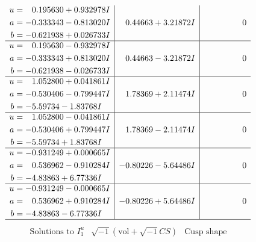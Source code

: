 \documentclass[1p]{elsarticle_modified}
\theoremstyle{definition}
\newcommand{\I}{\sqrt{-1}}
\begin{document}
$$\begin{array}{c|c|c}
\begin{aligned}
u &= \phantom{-}0.195630 + 0.932978 I \\
a &= -0.333343 - 0.813020 I \\
b &= -0.621938 + 0.026733 I\end{aligned}
 & \phantom{-}0.44663 + 3.21872 I & \phantom{-0.000000 } 0 \\ \hline\begin{aligned}
u &= \phantom{-}0.195630 - 0.932978 I \\
a &= -0.333343 + 0.813020 I \\
b &= -0.621938 - 0.026733 I\end{aligned}
 & \phantom{-}0.44663 - 3.21872 I & \phantom{-0.000000 } 0 \\ \hline\begin{aligned}
u &= \phantom{-}1.052800 + 0.041861 I \\
a &= -0.530406 - 0.799447 I \\
b &= -5.59734 - 1.83768 I\end{aligned}
 & \phantom{-}1.78369 + 2.11474 I & \phantom{-0.000000 } 0 \\ \hline\begin{aligned}
u &= \phantom{-}1.052800 - 0.041861 I \\
a &= -0.530406 + 0.799447 I \\
b &= -5.59734 + 1.83768 I\end{aligned}
 & \phantom{-}1.78369 - 2.11474 I & \phantom{-0.000000 } 0 \\ \hline\begin{aligned}
u &= -0.931249 + 0.000665 I \\
a &= \phantom{-}0.536962 - 0.910284 I \\
b &= -4.83863 + 6.77336 I\end{aligned}
 & -0.80226 - 5.64486 I & \phantom{-0.000000 } 0 \\ \hline\begin{aligned}
u &= -0.931249 - 0.000665 I \\
a &= \phantom{-}0.536962 + 0.910284 I \\
b &= -4.83863 - 6.77336 I\end{aligned}
 & -0.80226 + 5.64486 I & \phantom{-0.000000 } 0\\
 \hline 
 \end{array}$$\newpage$$\begin{array}{c|c|c}  
\text{Solutions to }I^u_{1}& \I (\text{vol} + \sqrt{-1}CS) & \text{Cusp shape}\\
 \hline 
\begin{aligned}

\end{aligned}
\end{array}$$
\end{document}
